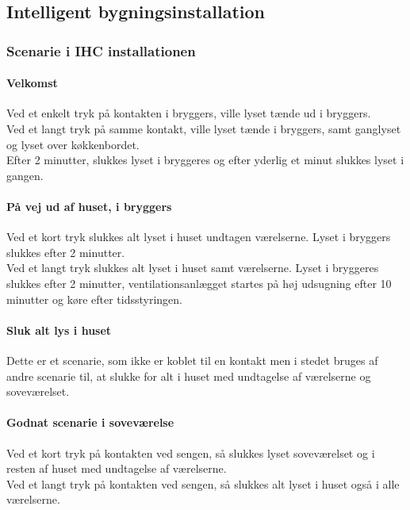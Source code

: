 \subsection{Intelligent bygningsinstallation}

\subsubsection{Scenarie i IHC installationen} \label{subsub:ihc_scener}

\paragraph{Velkomst}
Ved et enkelt tryk på kontakten i bryggers, ville lyset tænde ud i bryggers.\\
Ved et langt tryk på samme kontakt, ville lyset tænde i bryggers, 
samt ganglyset og lyset over køkkenbordet.\\
Efter 2 minutter, slukkes lyset i bryggeres og efter yderlig et minut slukkes lyset i gangen.

\paragraph{På vej ud af huset, i bryggers}
Ved et kort tryk slukkes alt lyset i huset undtagen værelserne. 
Lyset i bryggers slukkes efter 2 minutter. \\
Ved et langt tryk slukkes alt lyset i huset samt værelserne. 
Lyset i bryggeres slukkes efter 2 minutter, 
ventilationsanlægget startes på høj udsugning efter 10 minutter og køre efter tidsstyringen. 

\paragraph{Sluk alt lys i huset}
Dette er et scenarie, som ikke er koblet til en kontakt men i stedet bruges af andre scenarie til, 
at slukke for alt i huset med undtagelse af værelserne og soveværelset.

\paragraph{Godnat scenarie i soveværelse}
Ved et kort tryk på kontakten ved sengen, 
så slukkes lyset soveværelset og i resten af huset med undtagelse af værelserne.\\
Ved et langt tryk på kontakten ved sengen, 
så slukkes alt lyset i huset også i alle værelserne.

